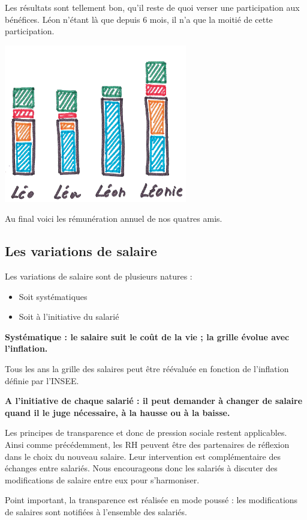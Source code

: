 \documentclass[12pt]{article}
\newcommand{\regle}[1]{%
  \begin{tcolorbox}[colframe=DarkOrange,boxrule=2pt,arc=4pt,left=6pt,right=6pt,top=6pt,bottom=6pt,boxsep=0pt,colback=LightOrange]
  \textbf{#1}
  \end{tcolorbox}
}
\begin{document}
 Les résultats sont tellement bon, qu’il reste de quoi verser une participation aux bénéfices. Léon n’étant là que depuis 6 mois, il n’a que la moitié de cette participation.

 \begin{center}
 \includegraphics[width=0.6\textwidth]{includes/remuneration}
 \end{center}
 Au final voici les rémunération annuel de nos quatres amis.

\subsection{Les variations de salaire}
 Les variations de salaire sont de plusieurs natures : 
 \begin{itemize}
   \item Soit systématiques
   \item Soit à l’initiative du salarié
 \end{itemize}

 \regle{Systématique : le salaire suit le coût de la vie ; la grille évolue avec l’inflation.}

 Tous les ans la grille des salaires peut être réévaluée en fonction de l’inflation définie par l’INSEE.

 \regle{A l'initiative de chaque salarié : il peut demander à changer de salaire quand il le juge nécessaire, à la hausse ou à la baisse.}

 Les principes de transparence et donc de pression sociale restent applicables. Ainsi comme précédemment, les RH peuvent être des partenaires de réflexion dans le choix du nouveau salaire. Leur intervention est complémentaire des échanges entre salariés. Nous encourageons donc les salariés à discuter des modifications de salaire entre eux pour s’harmoniser. 

 Point important, la transparence est réalisée en mode poussé : les modifications de salaires sont notifiées à l’ensemble des salariés. 
\end{document}
